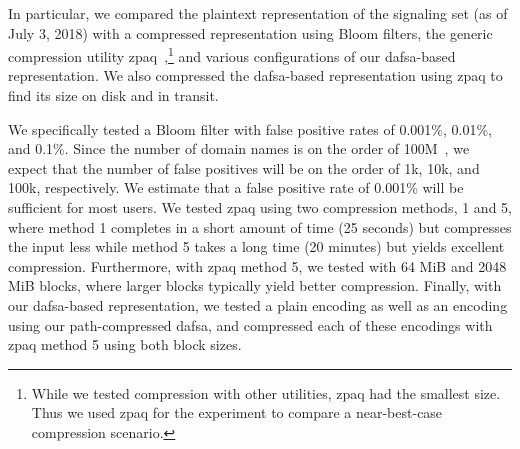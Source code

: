 In particular, we compared the plaintext representation of the signaling set (as
of July 3, 2018) with a compressed representation using Bloom filters, the
generic compression utility zpaq~\cite{zpaq},\footnote{While we tested compression with other
  utilities, zpaq had the smallest size. Thus we used zpaq for the experiment to
  compare a near-best-case compression scenario.} and various configurations of
our \ac{dafsa}-based representation. We also compressed the \ac{dafsa}-based
representation using zpaq to find its size on disk and in transit. 

We specifically tested a Bloom filter with false positive rates of 0.001\%,
0.01\%, and 0.1\%. Since the number of domain names is on the order of
100M~\cite{dnib-14-1}, we expect that the number of false positives will be on
the order of 1k, 10k, and 100k, respectively. We estimate that a false positive
rate of 0.001\% will be sufficient for most users. We tested zpaq using two
compression methods, 1 and 5, where method 1 completes in a short amount of time
(25 seconds) but compresses the input less while method 5 takes a long time (20
minutes) but yields excellent compression. Furthermore, with zpaq method 5, we
tested with 64 MiB and 2048 MiB blocks, where larger blocks typically yield
better compression. Finally, with our \ac{dafsa}-based representation, 
we tested a plain encoding as
well as an encoding using our path-compressed \ac{dafsa}, and compressed each of
these encodings with zpaq method 5 using both block sizes.



